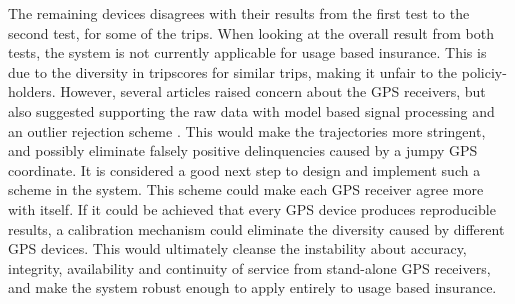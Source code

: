 The remaining devices disagrees with their results from the first test to the second test, for some of the trips. When looking at the overall result from both tests, the system is not currently applicable for usage based insurance. This is due to the diversity in tripscores for similar trips, making it unfair to the policiy-holders. However, several articles raised concern about the GPS receivers, but also suggested supporting the raw data with model based signal processing and an outlier rejection scheme\citep{art:challenges_smartphone_ubi} \citep{art:insurtelematics} \citep{art:smartphones_for_monitoring_and_ubi}. This would make the trajectories more stringent, and possibly eliminate falsely positive delinquencies caused by a jumpy GPS coordinate. It is considered a good next step to design and implement such a scheme in the system. This scheme could make each GPS receiver agree more with itself. If it could be achieved that every GPS device produces reproducible results, a calibration mechanism could eliminate the diversity caused by different GPS devices. This would ultimately cleanse the instability about accuracy, integrity, availability and continuity of service from stand-alone GPS receivers, and make the system robust enough to apply entirely to usage based insurance.


